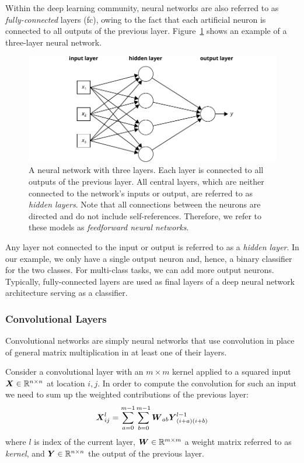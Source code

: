 Within the deep learning community, neural networks are also referred to as \emph{fully-connected} layers (\ac{fc}), owing to the fact that each artificial neuron is connected to all outputs of the previous layer. Figure~\ref{fig:nn} shows an example of a three-layer neural network.
%
	\begin{figure}[tp]
  		\centering
    	\includegraphics{img/nn.pdf}
    	\caption{A neural network with three layers. Each layer is connected to all outputs of the previous layer. All central layers, which are neither connected to the network's inputs or output, are referred to as \emph{hidden layers}. Note that all connections between the neurons are directed and do not include self-references. Therefore, we refer to these models as \emph{feedforward neural networks}.}
    	\label{fig:nn}
	\end{figure}
%
Any layer not connected to the input or output is referred to as a \emph{hidden layer}. In our example, we only have a single output neuron and, hence, a binary classifier for the two classes. For multi-class tasks, we can add more output neurons. Typically, fully-connected layers are used as final layers of a deep neural network architecture serving as a classifier.

\subsubsection{Convolutional Layers}

Convolutional networks are simply neural networks that use convolution in place of general matrix multiplication in at least one of their layers.

Consider a convolutional layer with an $m \times m$ kernel applied to a squared input $\boldsymbol{X} \in\mathbb{R}^{n \times n}$ at location $i, j$. In order to compute the convolution for such an input we need to sum up the weighted contributions of the previous layer:
$$
\boldsymbol{X}^l_{ij} = \sum_{a=0}^{m-1}\sum_{b=0}^{m-1} \boldsymbol{W}_{ab} \boldsymbol{Y}^{l-1}_{(i+a)(i+b)}
$$
where $l$ is index of the current layer, $ \boldsymbol{W} \in\mathbb{R}^{m \times m} $ a weight matrix referred to as \emph{kernel}, and $\boldsymbol{Y} \in\mathbb{R}^{n \times n} $ the output of the previous layer.

